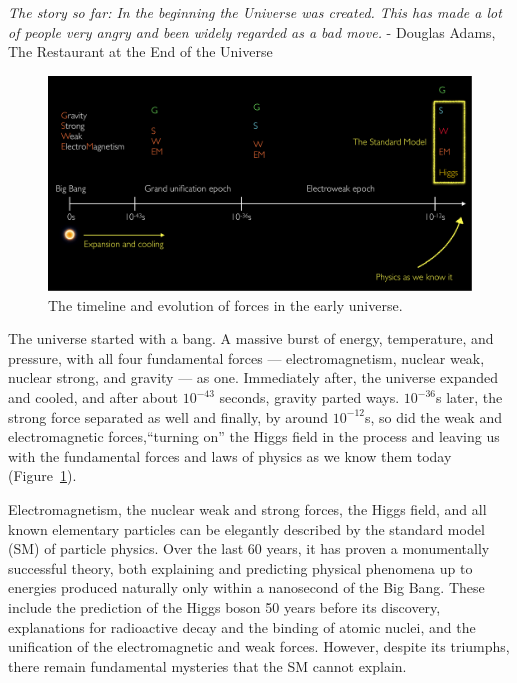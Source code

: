 \label{sec:intro}

\begin{center}
    \centering
    \noindent
    \textit{The story so far:
    In the beginning the Universe was created.
    This has made a lot of people very angry and been widely regarded as a bad move.
    }
    \baselineskip
    - Douglas Adams, The Restaurant at the End of the Universe
\end{center}

\baselineskip

\begin{figure}[h!]
    \centering
    \captionsetup{justification=centering}
    \includegraphics[width=\textwidth]{figures/00-Intro/universe_timeline.pdf}
    \caption{The timeline and evolution of forces in the early universe.}
    \label{fig:00_timeline}
\end{figure}

The universe started with a bang.
A massive burst of energy, temperature, and pressure, with all four fundamental forces --- electromagnetism, nuclear weak, nuclear strong, and gravity --- as one.
Immediately after, the universe expanded and cooled, and after about $10^{-43}$ seconds, gravity parted ways.
$10^{-36}$s later, the strong force separated as well and finally, by around $10^{-12}$s, so did the weak and electromagnetic forces,``turning on'' the Higgs field in the process and leaving us with the fundamental forces and laws of physics as we know them today (Figure~\ref{fig:00_timeline}).

Electromagnetism, the nuclear weak and strong forces, the Higgs field, and all known elementary particles can be elegantly described by the standard model (SM) of particle physics.
Over the last 60 years, it has proven a monumentally successful theory, both explaining and predicting physical phenomena up to energies produced naturally only within a nanosecond of the Big Bang.
These include the prediction of the Higgs boson 50 years before its discovery, explanations for radioactive decay and the binding of atomic nuclei, and the unification of the electromagnetic and weak forces.
However, despite its triumphs, there remain fundamental mysteries that the SM cannot explain.

